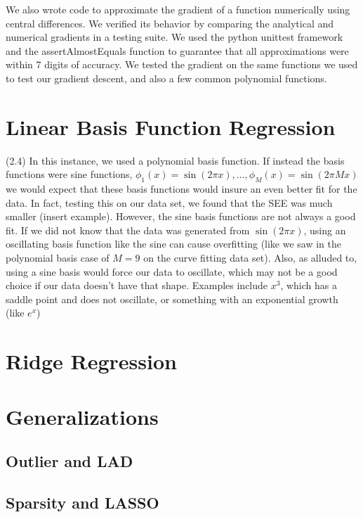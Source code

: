 \documentclass{article}
\begin{document}
We also wrote code to approximate the gradient of a function numerically using central differences.  We verified its behavior by comparing the analytical and numerical gradients in a testing suite.  We used the python unittest framework and the assertAlmostEquals function to guarantee that all approximations were within 7 digits of accuracy.  We tested the gradient on the same functions we used to test our gradient descent, and also a few common polynomial functions. 



\section{Linear Basis Function Regression}

(2.4) In this instance, we used a polynomial basis function.  If instead the basis functions were sine functions, $\phi_1(x)=\sin(2\pi x),...,\phi_M(x)=\sin(2\pi Mx)$ we would expect that these basis functions would insure an even better fit for the data.  In fact, testing this on our data set, we found that the SEE was much smaller (insert example).  However, the sine basis functions are not always a good fit.  If we did not know that the data was generated from $\sin(2\pi x)$, using an oscillating basis function like the sine can cause overfitting (like we saw in the polynomial basis case of $M=9$ on the curve fitting data set).  Also, as alluded to, using a sine basis would force our data to oscillate, which may not be a good choice if our data doesn't have that shape.  Examples include $x^3$, which has a saddle point and does not oscillate, or something with an exponential growth (like $e^x$)

\section{Ridge Regression} 

\section{Generalizations}
\subsection{Outlier and LAD}
\subsection{Sparsity and LASSO}
\end{document}
